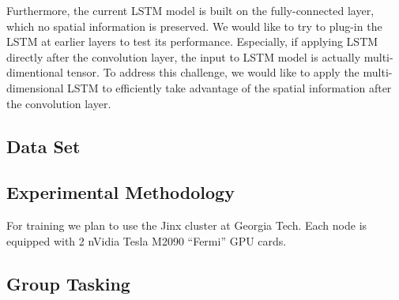 Furthermore, the current LSTM model is built on the fully-connected
layer, which no spatial information is preserved. We would like to
try to plug-in the LSTM at earlier layers to test its performance.
Especially, if applying LSTM directly after the convolution layer,
the input to LSTM model is actually multi-dimentional tensor. To address
this challenge, we would like to apply the multi-dimensional LSTM
\cite{byeon2015scene} to efficiently take advantage of the spatial
information after the convolution layer. 


\subsection*{Data Set}
\subsection*{Experimental Methodology}
\TODO{\dots}
For training we plan to use the Jinx cluster at Georgia Tech. Each node is equipped with 2 nVidia Tesla M2090 ``Fermi'' GPU cards.
\subsection*{Group Tasking}
\TODO{\dots}

